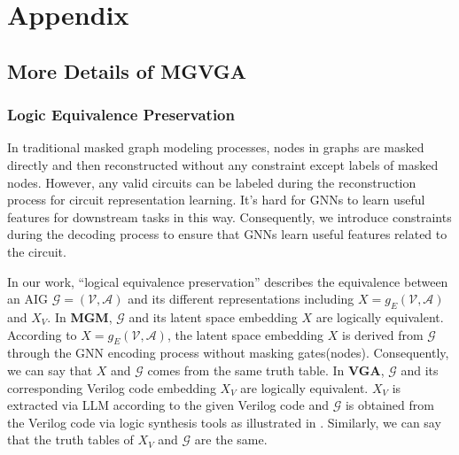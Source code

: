 \section{Appendix}

\subsection{More Details of MGVGA}

\subsubsection{Logic Equivalence Preservation}
\label{sec:preserve_logic_eq}

In traditional masked graph modeling processes, nodes in graphs are masked directly and then reconstructed without any constraint except labels of masked nodes.
However, any valid circuits can be labeled during the reconstruction process for circuit representation learning. 
It's hard for GNNs to learn useful features for downstream tasks in this way. 
Consequently, we introduce constraints during the decoding process to ensure that GNNs learn useful features related to the circuit. 

In our work, ``logical equivalence preservation'' describes the equivalence between an AIG $\mathcal{G} = (\mathcal{V}, \mathcal{A})$ and its different representations including $X=g_{E}(\mathcal{V}, \mathcal{A})$ and $X_V$.
In \textbf{MGM}, $\mathcal{G}$ and its latent space embedding $X$ are logically equivalent. 
According to $X=g_{E}(\mathcal{V}, \mathcal{A})$, the latent space embedding $X$ is derived from $\mathcal{G}$ through the GNN encoding process without masking gates(nodes).
Consequently, we can say that $X$ and $\mathcal{G}$ comes from the same truth table.
In \textbf{VGA}, $\mathcal{G}$ and its corresponding Verilog code embedding $X_V$ are logically equivalent. 
$X_V$ is extracted via LLM according to the given Verilog code and $\mathcal{G}$ is obtained from the Verilog code via logic synthesis tools as illustrated in .
Similarly, we can say that the truth tables of $X_V$ and $\mathcal{G}$ are the same.

